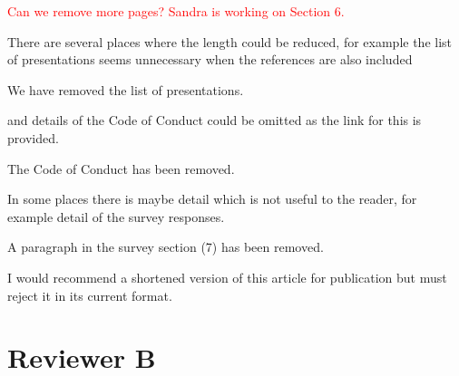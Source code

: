 \documentclass[11pt]{article}
\begin{document}
\textcolor{red}{Can we remove more pages? Sandra is working on Section 6.}

\begin{quoting}
There are several places where the length could be reduced, for example the list of presentations seems unnecessary when the references are also included 

\end{quoting}

We have removed the list of presentations.

\begin{quoting}

and details of the Code of Conduct could be omitted as the link for this is provided. 

\end{quoting}

The Code of Conduct has been removed.

\begin{quoting}

 In some places there is maybe detail which is not useful to the reader, for example detail of the survey responses.
 
\end{quoting}

A paragraph in the survey section (7) has been removed.

\begin{quoting}
I would recommend a shortened version of this article for publication but must reject it in its current format.
\end{quoting}


\section*{Reviewer B}
\end{document}
